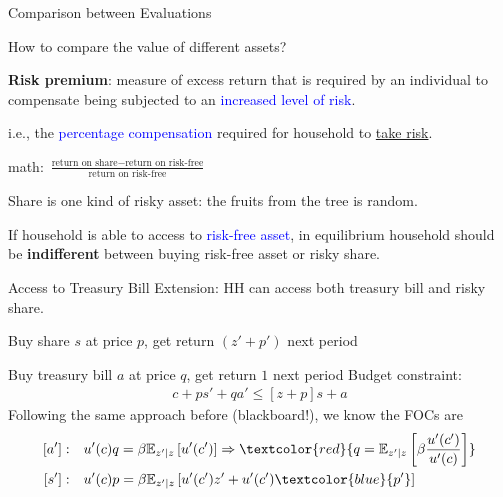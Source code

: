 \documentclass[aspectratio=169,xcolor=dvipsnames]{beamer}
\newcommand{\red}[1]{\textcolor{red}{#1}}
\newcommand{\blue}[1]{\textcolor{blue}{#1}}
\let\tempone\itemize
\let\temptwo\enditemize
\renewenvironment{itemize}{\tempone\addtolength{\itemsep}{\fill}}{\temptwo}
\begin{document}
\begin{frame}{Comparison between Evaluations}
\label{slide:Comparison_between_Evaluations}
    \begin{center}
        How to compare the value of different assets?
    \end{center}

    \begin{itemize}
        \item \textbf{Risk premium}: measure of excess return that is required by an individual to compensate being subjected to an \blue{increased level of risk}.
        \begin{itemize}
            \item i.e., the \blue{percentage compensation} required for household to \underline{take risk}.
            \item math: $ \displaystyle \frac{\text{return on share} - \text{return on risk-free}}{\text{return on risk-free}} $
        \end{itemize}
        \item Share is one kind of risky asset: the fruits from the tree is random.
        \item If household is able to access to \blue{risk-free asset}, in equilibrium household should be \textbf{indifferent} between buying risk-free asset or risky share.
    \end{itemize}
\end{frame}

\begin{frame}{Access to Treasury Bill}
\label{slide:Access_to_Treasury_Bill}
    Extension: HH can access both treasury bill and risky share.
    \begin{itemize}
        \item Buy share $ s $ at price $ p $, get return $ (z'+p') $ next period
        \item Buy treasury bill $ a $ at price $ q $, get return $ 1 $ next period
    \end{itemize}
    \medskip
    Budget constraint:
    \begin{align}
        c + p s' + q a' \le [z+p]s + a
    \end{align}
    Following the same approach before (blackboard!), we know the FOCs are
    \begin{align}
        \label{eq:riskFreeSDF}
        [a']: \quad
            & u'(c) q = \beta \mathbb{E}_{z'|z} \left[
                u'(c')
            \right] \Rightarrow \red{q = \mathbb{E}_{z'|z}\left[
                \beta \frac{u'(c')}{u'(c)}
            \right]}
        \\
        [s']: \quad
            &  u'(c) p = \beta \mathbb{E}_{z'|z} \left[
                u'(c') z' + u'(c') \blue{p'}
            \right]
    \end{align}

\end{frame}
\end{document}

